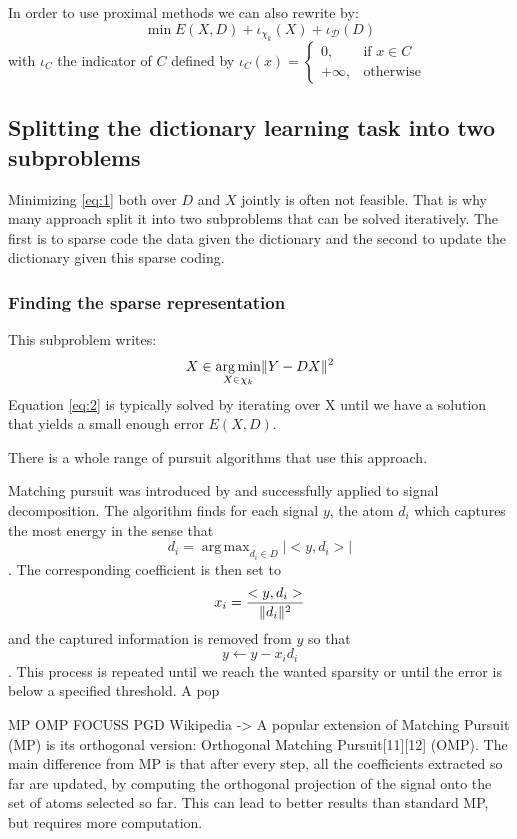 \documentclass[a4paper,11pt]{article}
\DeclarePairedDelimiter\norm{\lVert}{\rVert} %
\DeclareMathOperator*{\argmin}{arg\,min} %
\DeclareMathOperator*{\argmax}{arg\,max} %
\begin{document}
In order to use proximal methods we can also rewrite \label{eq:1} by:
$$\min E(X,D) + \iota_{\chi_k}(X) + \iota_{\mathcal{D}}(D)$$
with $\iota_C$ the indicator of $C$ defined by
$ \iota_C(x) =
\begin{cases}
0, & \text{if } x \in C\\
+ \infty, & \text{otherwise}
\end{cases}
$

\subsection{Splitting the dictionary learning task into two subproblems}
Minimizing \ref{eq:1} both over $D$ and $X$ jointly is often not feasible.
That is why many approach split it into two subproblems that can be solved iteratively.
The first is to sparse code the data given the dictionary and the second to update the dictionary given this sparse coding.

\subsubsection{Finding the sparse representation}
This subproblem writes:
\begin{equation} \label{eq:2}
X \in \argmin_{X \in \chi_k} \norm{Y - DX}^2
\end{equation}
Equation \ref{eq:2} is typically solved by iterating over X until we have a solution that yields a small enough error $E(X,D)$.

There is a whole range of pursuit algorithms that use this approach.

Matching pursuit was introduced by \cite{mallat93} and successfully applied to signal decomposition.
The algorithm finds for each signal $y$, the atom $d_i$ which captures the most energy in the sense that
$$d_i = \argmax_{d_i \in D} |<y, d_i>|$$.
The corresponding coefficient is then set to $$x_i = \frac{<y, d_i>}{\norm{d_i}^2}$$ and the captured information is removed from $y$ so that $$y \leftarrow y - x_i d_i$$.
This process is repeated until we reach the wanted sparsity or until the error is below a specified threshold.
A pop

MP OMP FOCUSS \cite{gorodnitsky97} PGD
Wikipedia -> A popular extension of Matching Pursuit (MP) is its orthogonal version: Orthogonal Matching Pursuit[11][12] (OMP). The main difference from MP is that after every step, all the coefficients extracted so far are updated, by computing the orthogonal projection of the signal onto the set of atoms selected so far. This can lead to better results than standard MP, but requires more computation.
\end{document}

